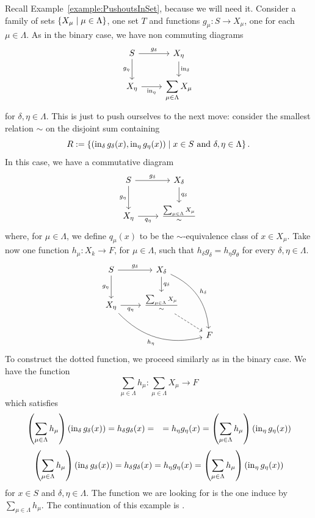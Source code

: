 \begin{example}
  Recall Example~\ref{example:PushoutsInSet}, because we will need
  it. Consider a family of sets \(\left\{X_\mu \mid \mu \in \Lambda\right\}\),
  one set \(T\) and functions \(g_\mu : S \to X_\mu\), one for each
  \(\mu \in \Lambda\). As in the binary case, we have non commuting
  diagrams
  \[\begin{tikzcd}
      S \ar["{g_\delta}", r] \ar["{g_\eta}", d, swap] & X_\eta \ar["{\inj_\delta}", d] \\
      X_\eta \ar["{\inj_\eta}", r, swap] & {\displaystyle\sum_{\mu \in
          \Lambda} X_\mu}
    \end{tikzcd}\] for \(\delta, \eta \in \Lambda\). This is just to
  push ourselves to the next move: consider the smallest relation
  \(\sim\) on the disjoint sum containing
  \[R := \left\{(\operatorname{in}_\delta g_\delta (x), \operatorname{in}_\eta g_\eta(x)) \mid x \in
      S \text{ and } \delta, \eta \in \Lambda\right\} .\] In this case, we have
  a commutative diagram
  \[\begin{tikzcd}
      S \ar["{g_\delta}", r] \ar["{g_\eta}", d, swap] & X_\delta \ar["{q_\delta}", d] \\
      X_\eta \ar["{q_\eta}", r, swap] & \frac{\sum_{\mu \in \Lambda}
        X_\mu}{\sim}
    \end{tikzcd}\] where, for \(\mu \in \Lambda\), we define
  \(q_\mu (x)\) to be the \(\sim\)-equivalence class of \(x \in
  X_\mu\). Take now one function \(h_\mu : X_k \to F\), for
  \(\mu \in \Lambda\), such that \(h_\delta g_\delta = h_\eta g_\theta\)
  for every \(\delta, \eta \in \Lambda\).
  \[\begin{tikzcd}
      S \ar["{g_\delta}", r] \ar["{g_\eta}", d, swap] & X_\delta \ar["{q_\delta}", d] \ar["{h_\delta}", ddr, bend left] \\
      X_\eta \ar["{q_\eta}", r, swap] \ar["{h_\eta}", drr, bend right, swap] & \frac{\sum_{\mu \in \Lambda} X_\mu}{\sim} \ar[dr, dashed] \\
      & & F
    \end{tikzcd}\] To construct the dotted function, we proceed
  similarly as in the binary case. We have the function
  \[\sum_{\mu \in \Lambda} h_\mu : \sum_{\mu \in \Lambda} X_\mu \to F\]
  which satisfies
  \begin{align*}
    & \left( \sum_{\mu \in \Lambda} h_\mu \right) (\inj_\delta g_\delta (x)) = h_\delta g_\delta (x) =  %
    & = h_\eta g_\eta (x) = \left( \sum_{\mu \in \Lambda} h_\mu \right) (\inj_\eta g_\eta (x))
  \end{align*}
  \[\left( \sum_{\mu \in \Lambda} h_\mu \right) (\operatorname{in}_\delta g_\delta (x)) = h_\delta g_\delta (x) = h_\eta
    g_\eta (x) = \left( \sum_{\mu \in \Lambda} h_\mu \right) (\operatorname{in}_\eta g_\eta (x))\] for
  \(x \in S\) and \(\delta, \eta \in \Lambda\). The function we are looking for is the one
  induce by \(\sum_{\mu \in \Lambda} h_\mu\). The continuation of this example is
  .
\end{example}

